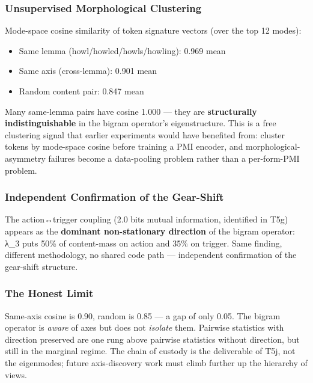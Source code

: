 \documentclass[
  twocolumn,
  10pt,
  a4paper]{article}
\providecommand{\tightlist}{%
  \setlength{\itemsep}{0pt}\setlength{\parskip}{0pt}}
\begin{document}
\hypertarget{unsupervised-morphological-clustering}{%
\subsubsection{Unsupervised Morphological
Clustering}\label{unsupervised-morphological-clustering}}

Mode-space cosine similarity of token signature vectors (over the top 12
modes):

\begin{itemize}
\tightlist
\item
  Same lemma (howl/howled/howls/howling): 0.969 mean
\item
  Same axis (cross-lemma): 0.901 mean
\item
  Random content pair: 0.847 mean
\end{itemize}

Many same-lemma pairs have cosine 1.000 --- they are
\textbf{structurally indistinguishable} in the bigram operator's
eigenstructure. This is a free clustering signal that earlier
experiments would have benefited from: cluster tokens by mode-space
cosine before training a PMI encoder, and morphological-asymmetry
failures become a data-pooling problem rather than a per-form-PMI
problem.

\hypertarget{independent-confirmation-of-the-gear-shift}{%
\subsubsection{Independent Confirmation of the
Gear-Shift}\label{independent-confirmation-of-the-gear-shift}}

The action↔trigger coupling (2.0 bits mutual information, identified in
T5g) appears as the \textbf{dominant non-stationary direction} of the
bigram operator: λ\_3 puts 50\% of content-mass on action and 35\% on
trigger. Same finding, different methodology, no shared code path ---
independent confirmation of the gear-shift structure.

\hypertarget{the-honest-limit}{%
\subsubsection{The Honest Limit}\label{the-honest-limit}}

Same-axis cosine is 0.90, random is 0.85 --- a gap of only 0.05. The
bigram operator is \emph{aware} of axes but does not \emph{isolate}
them. Pairwise statistics with direction preserved are one rung above
pairwise statistics without direction, but still in the marginal regime.
The chain of custody is the deliverable of T5j, not the eigenmodes;
future axis-discovery work must climb further up the hierarchy of views.
\end{document}
